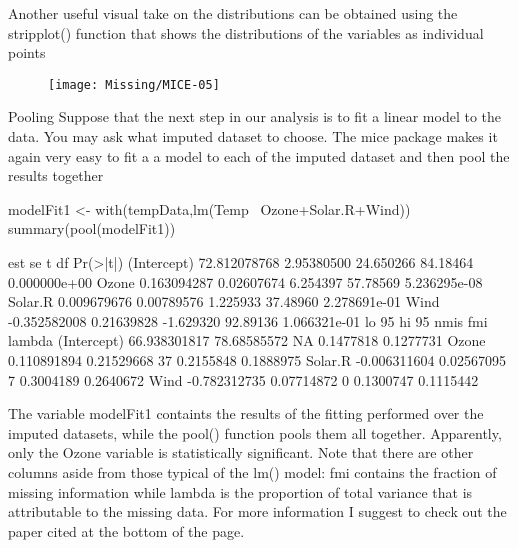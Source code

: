 \begin{frame}[fragile]
Another useful visual take on the distributions can be obtained using the stripplot() function that shows the distributions of the variables as individual points
%
\end{frame}
\begin{frame}

\begin{figure}
\centering
\texttt{[image: Missing/MICE-05]}
\end{figure}

\end{frame}
\begin{frame}
Pooling
Suppose that the next step in our analysis is to fit a linear model to the data. You may ask what imputed dataset to choose. The mice package makes it again very easy to fit a a model to each of the imputed dataset and then pool the results together
\end{frame}
\begin{frame}[fragile]

modelFit1 <- with(tempData,lm(Temp~ Ozone+Solar.R+Wind))
summary(pool(modelFit1))

                     est         se         t       df     Pr(>|t|)
(Intercept) 72.812078768 2.95380500 24.650266 84.18464 0.000000e+00
Ozone        0.163094287 0.02607674  6.254397 57.78569 5.236295e-08
Solar.R      0.009679676 0.00789576  1.225933 37.48960 2.278691e-01
Wind        -0.352582008 0.21639828 -1.629320 92.89136 1.066321e-01
                   lo 95       hi 95 nmis       fmi    lambda
(Intercept) 66.938301817 78.68585572   NA 0.1477818 0.1277731
Ozone        0.110891894  0.21529668   37 0.2155848 0.1888975
Solar.R     -0.006311604  0.02567095    7 0.3004189 0.2640672
Wind        -0.782312735  0.07714872    0 0.1300747 0.1115442

\end{frame}
\begin{frame}
The variable modelFit1 containts the results of the fitting performed over the imputed datasets, while the pool() function pools them all together. Apparently, only the Ozone variable is statistically significant.
Note that there are other columns aside from those typical of the lm() model: fmi contains the fraction of missing information while lambda is the proportion of total variance that is attributable to the missing data. For more information I suggest to check out the paper cited at the bottom of the page.
\end{frame}

